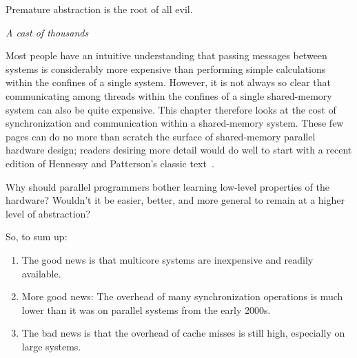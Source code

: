 

\epigraph{Premature abstraction is the root of all evil.}
	 {\emph{A cast of thousands}}

Most people have an intuitive understanding that passing messages between
systems is considerably more expensive than performing simple calculations
within the confines of a single system.
However, it is not always so clear that communicating among threads within
the confines of a single shared-memory system can also be quite expensive.
This chapter therefore looks at the cost of synchronization and communication
within a shared-memory system.
These few pages can do no more than scratch the surface of shared-memory
parallel hardware design; readers desiring more detail would do well
to start with a recent edition of Hennessy and Patterson's classic
text~\cite{Hennessy2011,Hennessy95a}.

\QuickQuiz{}
	Why should parallel programmers bother learning low-level
	properties of the hardware?
	Wouldn't it be easier, better, and more general to remain at
	a higher level of abstraction?
 \QuickQuizEnd






So, to sum up:

\begin{enumerate}
\item	The good news is that multicore systems are inexpensive and
	readily available.
\item	More good news:  The overhead of many synchronization operations
	is much lower than it was on parallel systems from the early 2000s.
\item	The bad news is that the overhead of cache misses is still high,
	especially on large systems.
\end{enumerate}

